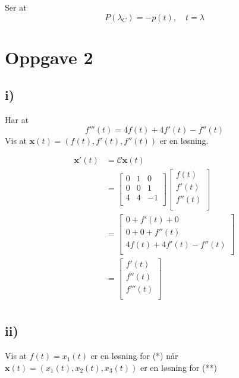 \documentclass[a4paper, norsk, twoside, 10pt]{article}
\begin{document}
\begin{flushleft}
  Ser at \[P(\lambda_{C}) = -p(t), \quad t = \lambda\]


  \newpage

  \section*{Oppgave 2}

  \subsection*{i)}
  Har at\[f'''(t) = 4f(t) + 4f'(t)- f''(t)\]
  Vis at $\mathbf{x}(t) = (f(t), f'(t), f''(t))$ er en løsning.

  \begin{align*}
    \mathbf{x}'(t) &= \mathcal{C}\mathbf{x}(t) \\
    &= \begin{bmatrix}
      0 & 1 & 0 \\
      0 & 0 & 1 \\
      4 & 4 & -1 \\
    \end{bmatrix}
    \begin{bmatrix}
      f(t) \\
      f'(t) \\
      f''(t) \\
    \end{bmatrix}
    \\
    &= \begin{bmatrix}
      0 + f'(t) + 0 \\
      0 + 0 + f''(t) \\
      4f(t) + 4f'(t) -f''(t) \\
    \end{bmatrix} \\
    &= \begin{bmatrix}
      f'(t) \\
      f''(t) \\
      f'''(t)\\
    \end{bmatrix} \\
  \end{align*}

  \subsection*{ii)}

  Vis at $f(t) = x_{1}(t)$ er en løsning for (*) når $\mathbf{x}(t) = (x_{1}(t), x_{2}(t) , x_{3}(t))$ er en løsning for (**) \\


\end{flushleft}
\end{document}
